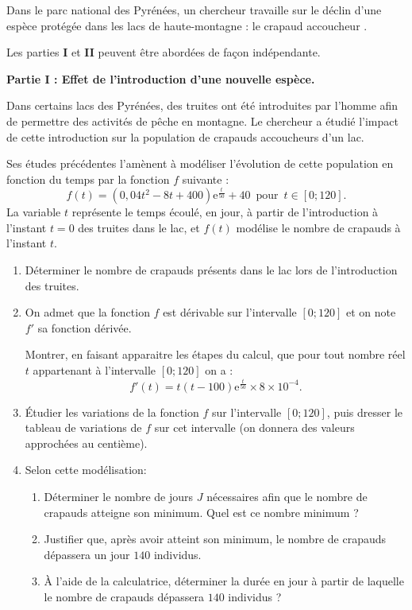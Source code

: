 Dans le parc national des Pyrénées, un chercheur travaille sur le déclin d'une espèce protégée dans les lacs de haute-montagne : le \og crapaud accoucheur \fg.

Les parties \textbf{I} et \textbf{II} peuvent être abordées de façon indépendante.

\begin{center}\textbf{Partie I : Effet de l'introduction d'une nouvelle espèce.}\end{center}

Dans certains lacs des Pyrénées, des truites ont été introduites par l'homme afin de permettre des activités de pêche en montagne. Le chercheur a étudié l'impact de cette introduction sur la population de crapauds accoucheurs d'un lac.

Ses études précédentes l'amènent à modéliser l'évolution de cette population en fonction du temps par la fonction $f$ suivante : \[f(t) = \left(0,04t^2 - 8t + 400\right)\text{e}^{\frac{t}{50}} + 40 \, \text{ pour }\,  t \in [0;120].\]
%
La variable $t$ représente le temps écoulé, en jour, à partir de l'introduction à l'instant $t = 0$ des truites dans le lac, et $f(t)$ modélise le nombre de crapauds à l'instant $t$.

\begin{enumerate}
	\item Déterminer le nombre de crapauds présents dans le lac lors de l'introduction des truites.
	\item On admet que la fonction $f$ est dérivable sur l'intervalle $[0;120]$ et on note $f'$ sa fonction dérivée.
	
	Montrer, en faisant apparaitre les étapes du calcul, que pour tout nombre réel $t$ appartenant à l'intervalle $[0;120]$ on a : \[f'(t) = t(t - 100)\text{e}^{\frac{t}{50}} \times 8 \times 10^{-4}.\]
	\item Étudier les variations de la fonction $f$ sur l'intervalle $[0;120]$, puis dresser le tableau de variations de $f$ sur cet intervalle (on donnera des valeurs approchées au centième).
	\item Selon cette modélisation:
	\begin{enumerate}
		\item Déterminer le nombre de jours $J$ nécessaires afin que le nombre de crapauds atteigne son minimum. Quel est ce nombre minimum ?
		\item Justifier que, après avoir atteint son minimum, le nombre de crapauds dépassera un jour $140$ individus.
		\item À l'aide de la calculatrice, déterminer la durée en jour à partir de laquelle le nombre de crapauds dépassera $140$ individus ?
	\end{enumerate}
\end{enumerate}

